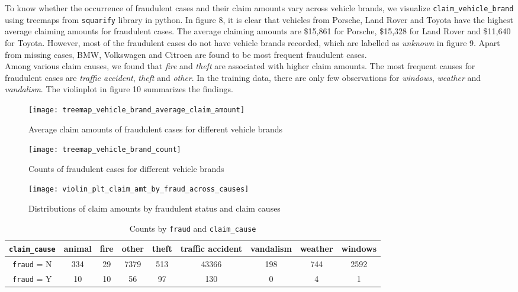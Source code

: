 \documentclass[12pt]{article}
\begin{document}
To know whether the occurrence of fraudulent cases and their claim amounts vary across vehicle brands, we visualize \texttt{claim\_vehicle\_brand} using treemaps from \texttt{squarify} library in python. In figure 8, it is clear that vehicles from Porsche, Land Rover and Toyota have the highest average claiming amounts for fraudulent cases. The average claiming amounts are \$15,861 for Porsche, \$15,328 for Land Rover and \$11,640 for Toyota. However, most of the fraudulent cases do not have vehicle brands recorded, which are labelled as \textit{unknown} in figure 9. Apart from missing cases, BMW, Volkswagen and Citroen are found to be most frequent fraudulent cases. \\

Among various claim causes, we found that \textit{fire} and \textit{theft} are associated with higher claim amounts. The most frequent causes for fraudulent cases are \textit{traffic accident}, \textit{theft} and \textit{other}. In the training data, there are only few observations for \textit{windows}, \textit{weather} and \textit{vandalism}. The violinplot in figure 10 summarizes the findings. 

\begin{figure}[h]
\centering
\texttt{[image: treemap\_vehicle\_brand\_average\_claim\_amount]}
\caption{Average claim amounts of fraudulent cases for different vehicle brands}
\vspace{0.5cm}
\texttt{[image: treemap\_vehicle\_brand\_count]}
\caption{Counts of fraudulent cases for different vehicle brands}
\vspace{0.5cm}
\texttt{[image: violin\_plt\_claim\_amt\_by\_fraud\_across\_causes]}
\caption{Distributions of claim amounts by fraudulent status and claim causes}
\end{figure}

\clearpage

\begin{table}
	\begin{tabular}{|c|cccccccc|}
	\hline
	\texttt{claim\_cause} & animal & fire & other & theft & traffic accident & vandalism & weather & windows \\
	\hline
	\texttt{fraud} = N & 334 & 29 & 7379 & 513 & 43366 & 198 & 744 & 2592 \\
	\texttt{fraud} = Y & 10 & 10 & 56 & 97 & 130 & 0 & 4 & 1\\
	\hline
	\end{tabular}
	\caption{Counts by \texttt{fraud} and \texttt{claim\_cause}}
\end{table}
\end{document}
